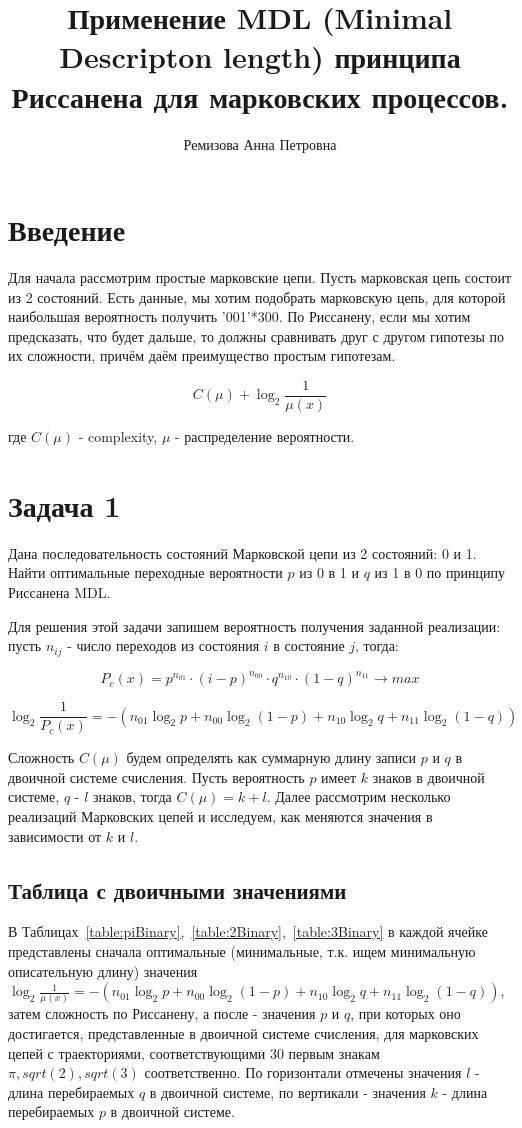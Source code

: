\documentclass[12pt]{article}
\begin{document}
	\title{Применение MDL (Minimal Descripton length) принципа Риссанена для марковских процессов.}
	\author{Ремизова Анна Петровна}
	\maketitle
	
	\section*{Введение}
	Для начала рассмотрим простые марковские цепи. Пусть марковская цепь состоит из 2 состояний. Есть данные, мы хотим подобрать марковскую цепь, для которой наибольшая вероятность получить '001'*300. По Риссанену, если мы хотим предсказать, что будет дальше, то должны сравнивать друг с другом гипотезы по их сложности, причём даём преимущество простым гипотезам.
	
	$$C(\mu)+\log_2{\frac{1}{\mu(x)}}$$
	
	где $C(\mu)$ - complexity, $\mu$ - распределение вероятности.
	
	\section*{Задача 1}
	Дана последовательность состояний Марковской цепи из 2 состояний: 0 и 1. Найти оптимальные переходные вероятности $p$ из 0 в 1 и $q$ из 1 в 0 по принципу Риссанена MDL. 
	
	Для решения этой задачи запишем вероятность получения заданной реализации: пусть $n_{ij}$ - число переходов из состояния $i$ в состояние $j$, тогда:
	
	$$P_c(x) = p^{n_{01}}\cdot(i-p)^{n_{00}}\cdot q^{n_{10}}\cdot(1-q)^{n_{11}}\to max$$ 
	
	$$\log_2{\frac{1}{P_c(x)}}=-(n_{01}\log_2{p}+n_{00}\log_2{(1-p)}+n_{10}\log_2{q}+n_{11}\log_2{(1-q)})$$
	
	Сложность $C(\mu)$ будем определять как суммарную длину записи $p$ и $q$ в двоичной системе счисления. Пусть вероятность $p$ имеет $k$ знаков в двоичной системе, $q$ - $l$ знаков, тогда $C(\mu)=k+l$. Далее рассмотрим несколько реализаций Марковских цепей и исследуем, как меняются значения в зависимости от $k$ и $l$.
	
	\subsection*{Таблица с двоичными значениями}
	В Таблицах~\ref{table:piBinary},~\ref{table:2Binary},~\ref{table:3Binary} в каждой ячейке представлены сначала оптимальные (минимальные, т.к. ищем минимальную описательную длину) значения $\log_2{\frac{1}{\mu(x)}}=-(n_{01}\log_2{p}+n_{00}\log_2{(1-p)}+n_{10}\log_2{q}+n_{11}\log_2{(1-q)})$, затем сложность по Риссанену, а после - значения $p$ и $q$, при которых оно достигается, представленные в двоичной системе счисления, для марковских цепей с траекториями, соответствующими 30 первым знакам $\pi, sqrt(2), sqrt(3)$ соответственно. По горизонтали отмечены значения $l$ - длина перебираемых $q$  в двоичной системе, по вертикали - значения $k$ - длина перебираемых $p$  в двоичной системе.
	
\end{document}
